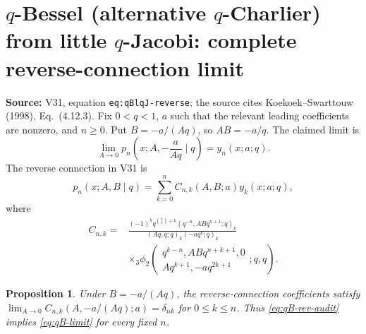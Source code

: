\documentclass[11pt]{article}
\newtheorem{proposition}{Proposition}
\begin{document}
\section{$q$-Bessel (alternative $q$-Charlier) from little $q$-Jacobi: complete reverse-connection limit}
\noindent\textbf{Source:} V31, equation \texttt{eq:qBlqJ-reverse}; the source cites Koekoek--Swarttouw (1998), Eq.~(4.12.3).
Fix $0<q<1$, $a$ such that the relevant leading coefficients are nonzero, and $n\ge0$. Put $B=-a/(Aq)$, so $AB=-a/q$. The claimed limit is
\begin{equation}\label{eq:qB-limit}
\lim_{A\to0}p_n\left(x;A,-\frac{a}{Aq}\mid q\right)=y_n(x;a;q).
\end{equation}
The reverse connection in V31 is
\begin{equation}\label{eq:qB-rev-audit}
 p_n(x;A,B\mid q)=\sum_{k=0}^n C_{n,k}(A,B;a)y_k(x;a;q),
\end{equation}
where
\begin{align*}
C_{n,k}={}&\frac{(-1)^kq^{\binom{k}{2}+k}(q^{-n},ABq^{n+1};q)_k}
{(Aq,q;q)_k(-aq^k;q)_k}\\
&\times{}_3\phi_2\!\left(\begin{matrix}q^{k-n},ABq^{n+k+1},0\\Aq^{k+1},-aq^{2k+1}\end{matrix};q,q\right).
\end{align*}
\begin{proposition}
Under $B=-a/(Aq)$, the reverse-connection coefficients satisfy
$\lim_{A\to0}C_{n,k}(A,-a/(Aq);a)=\delta_{nk}$ for $0\le k\le n$.
Thus \eqref{eq:qB-rev-audit} implies \eqref{eq:qB-limit} for every fixed $n$.
\end{proposition}
\end{document}
